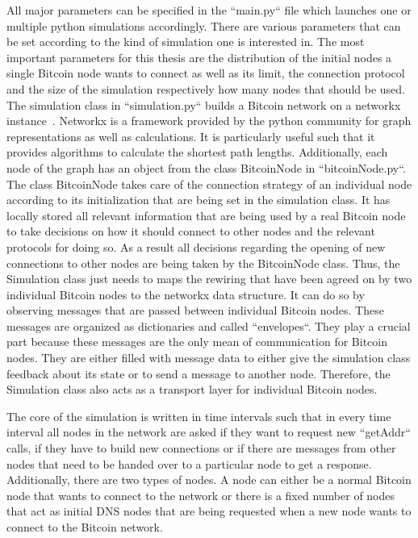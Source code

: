 \documentclass[a4paper, oneside]{discothesis}
\begin{document}
All major parameters can be specified in the ``main.py`` file which launches one or multiple python simulations accordingly. There are various parameters that can be set according to the kind of simulation one is interested in. The most important parameters for this thesis are the distribution of the initial nodes a single Bitcoin node wants to connect as well as its limit, the connection protocol and the size of the simulation respectively how many nodes that should be used.
The simulation class in ``simulation.py`` builds a Bitcoin network on a networkx instance~\cite{networkx}. Networkx is a framework provided by the python community for graph representations as well as calculations. It is particularly useful such that it provides algorithms to calculate the shortest path lengths.
Additionally, each node of the graph has an object from the class BitcoinNode in ``bitcoinNode.py``. The class BitcoinNode takes care of the connection strategy of an individual node according to its initialization that are being set in the simulation class. It has locally stored all relevant information that are being used by a real Bitcoin node to take decisions on how it should connect to other nodes and the relevant protocols for doing so. As a result all decisions regarding the opening of new connections to other nodes are being taken by the BitcoinNode class. Thus, the Simulation class just needs to maps the rewiring that have been agreed on by two individual Bitcoin nodes to the networkx data structure. It can do so by observing messages that are passed between individual Bitcoin nodes.
These messages are organized as dictionaries and called ``envelopes``. They play a crucial part because these messages are the only mean of communication for Bitcoin nodes. They are either filled with message data to either give the simulation class feedback about its state or to send a message to another node. Therefore, the Simulation class also acts as a transport layer for individual Bitcoin nodes.

The core of the simulation is written in time intervals such that in every time interval all nodes in the network are asked if they want to request new ``getAddr`` calls, if they have to build new connections or if there are messages from other nodes that need to be handed over to a particular node to get a response.
Additionally, there are two types of nodes. A node can either be a normal Bitcoin node that wants to connect to the network or there is a fixed number of nodes that act as initial DNS nodes that are being requested when a new node wants to connect to the Bitcoin network.
\end{document}
